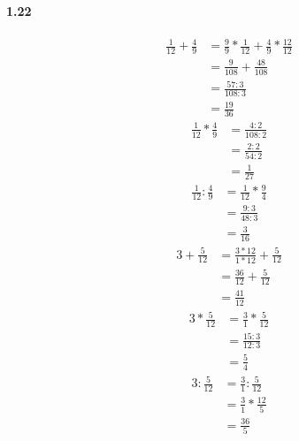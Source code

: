 \documentclass{article}
\begin{document}
\paragraph{1.22}
\begin{align*}
  \frac{1}{12} + \frac{4}{9} &= \frac{9}{9} * \frac{1}{12} + \frac{4}{9} * \frac{12}{12} \\
  &= \frac{9}{108} + \frac{48}{108} \\
  &= \frac{57:3}{108:3} \\
  &= \frac{19}{36}
\end{align*}
\begin{align*}
  \frac{1}{12} * \frac{4}{9} &= \frac{4:2}{108:2} \\
  &= \frac{2:2}{54:2} \\
  &= \frac{1}{27}
\end{align*}
\begin{align*}
  \frac{1}{12} : \frac{4}{9} &= \frac{1}{12} * \frac{9}{4} \\
  &= \frac{9:3}{48:3} \\
  &= \frac{3}{16}
\end{align*}
\begin{align*}
  3 + \frac{5}{12} &= \frac{3 * 12}{1 * 12} + \frac{5}{12} \\
  &= \frac{36}{12} + \frac{5}{12} \\
  &= \frac{41}{12}
\end{align*}
\begin{align*}
  3 * \frac{5}{12} &= \frac{3}{1} * \frac{5}{12} \\
  &= \frac{15:3}{12:3} \\
  &= \frac{5}{4}
\end{align*}
\begin{align*}
  3 : \frac{5}{12} &= \frac{3}{1} : \frac{5}{12} \\
  &= \frac{3}{1} * \frac{12}{5} \\
  &= \frac{36}{5}
\end{align*}
\end{document}
